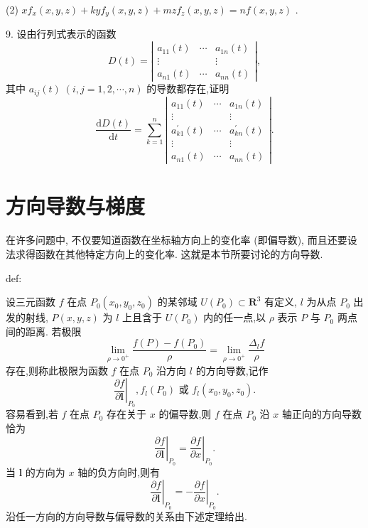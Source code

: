 (2) \(x{f}_{x}\left( {x,y,z}\right)  + {ky}{f}_{y}\left( {x,y,z}\right)  + {mz}{f}_{z}\left( {x,y,z}\right)  = {nf}\left( {x,y,z}\right)\) .

9. 设由行列式表示的函数
\[
D\left( t\right)  = \left| \begin{matrix} {a}_{11}\left( t\right) & \cdots & {a}_{1n}\left( t\right) \\  \vdots & & \vdots \\  {a}_{n1}\left( t\right) & \cdots & {a}_{nn}\left( t\right)  \end{matrix}\right| ,
\]
其中 \({a}_{ij}\left( t\right) \;\left( {i,j = 1,2,\cdots ,n}\right)\) 的导数都存在,证明
\[
\frac{\mathrm{d}D\left( t\right) }{\mathrm{d}t} = \mathop{\sum }\limits_{{k = 1}}^{n}\left| \begin{matrix} {a}_{11}\left( t\right) & \cdots & {a}_{1n}\left( t\right) \\  \vdots & & \vdots \\  {a}_{k1}^{\prime }\left( t\right) & \cdots & {a}_{kn}^{\prime }\left( t\right) \\  \vdots & & \vdots \\  {a}_{n1}\left( t\right) & \cdots & {a}_{nn}\left( t\right)  \end{matrix}\right| .
\]
\section{方向导数与梯度}

在许多问题中, 不仅要知道函数在坐标轴方向上的变化率 (即偏导数), 而且还要设法求得函数在其他特定方向上的变化率. 这就是本节所要讨论的方向导数.

\begin{definition}{}{def:}

\end{definition}
设三元函数 \(f\) 在点 \({P}_{0}\left( {{x}_{0},{y}_{0},{z}_{0}}\right)\) 的某邻域 \(U\left( {P}_{0}\right)  \subset  {\mathbf{R}}^{3}\) 有定义, \(l\) 为从点 \({P}_{0}\) 出发的射线, \(P\left( {x,y,z}\right)\) 为 \(l\) 上且含于 \(U\left( {P}_{0}\right)\) 内的任一点,以 \(\rho\) 表示 \(P\) 与 \({P}_{0}\) 两点间的距离. 若极限
\[
\mathop{\lim }\limits_{{\rho  \rightarrow  {0}^{ + }}}\frac{f\left( P\right)  - f\left( {P}_{0}\right) }{\rho } = \mathop{\lim }\limits_{{\rho  \rightarrow  {0}^{ + }}}\frac{{\Delta }_{l}f}{\rho }
\]
存在,则称此极限为函数 \(f\) 在点 \({P}_{0}\) 沿方向 \(l\) 的方向导数,记作
\[
{\left. \frac{\partial f}{\partial \mathbf{l}}\right| }_{{P}_{0}},{f}_{l}\left( {P}_{0}\right) \text{ 或 }{f}_{l}\left( {{x}_{0},{y}_{0},{z}_{0}}\right) .
\]
容易看到,若 \(f\) 在点 \({P}_{0}\) 存在关于 \(x\) 的偏导数,则 \(f\) 在点 \({P}_{0}\) 沿 \(x\) 轴正向的方向导数恰为
\[
{\left. \frac{\partial f}{\partial \mathbf{l}}\right| }_{{P}_{0}} = {\left. \frac{\partial f}{\partial x}\right| }_{{P}_{0}}.
\]
当 \(\mathbf{l}\) 的方向为 \(x\) 轴的负方向时,则有
\[
{\left. \frac{\partial f}{\partial \mathbf{l}}\right| }_{{P}_{0}} =  - {\left. \frac{\partial f}{\partial x}\right| }_{{P}_{0}}.
\]
沿任一方向的方向导数与偏导数的关系由下述定理给出.

